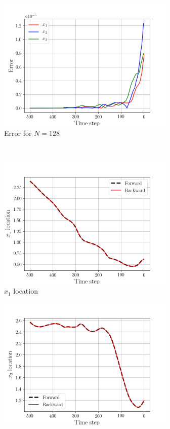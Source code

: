 \begin{figure}[H]
    \begin{subfigure}[H]{0.45\textwidth}
        \includegraphics[height=2.5in]{media/rk4/run-128/error-128.png}
        \caption{Error for $N=128$}
    \end{subfigure}
    ~
    \begin{subfigure}[H]{0.45\textwidth}
        \includegraphics[height=2.5in]{media/rk4/run-128/x1-128-tracking.png}
        \caption{$x_{1}$ location}
    \end{subfigure}
    \newline
    \begin{subfigure}[H]{0.45\textwidth}
        \includegraphics[height=2.5in]{media/rk4/run-128/x2-128-tracking.png}

\end{subfigure}
\end{figure}
